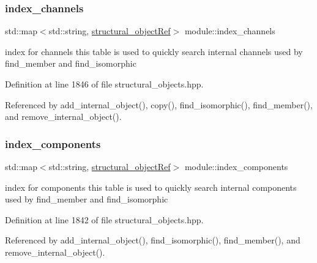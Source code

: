 \subsubsection{\texorpdfstring{index\+\_\+channels}{index\_channels}}
{\footnotesize\ttfamily std\+::map$<$std\+::string, \hyperlink{structural__objects_8hpp_a8ea5f8cc50ab8f4c31e2751074ff60b2}{structural\+\_\+object\+Ref}$>$ module\+::index\+\_\+channels\hspace{0.3cm}{\ttfamily [private]}}



index for channels this table is used to quickly search internal channels used by find\+\_\+member and find\+\_\+isomorphic 



Definition at line 1846 of file structural\+\_\+objects.\+hpp.



Referenced by add\+\_\+internal\+\_\+object(), copy(), find\+\_\+isomorphic(), find\+\_\+member(), and remove\+\_\+internal\+\_\+object().

\mbox{\label{classmodule_aaf6c17fc710da7415f1a8d566e7f9363}} 
\subsubsection{\texorpdfstring{index\+\_\+components}{index\_components}}
{\footnotesize\ttfamily std\+::map$<$std\+::string, \hyperlink{structural__objects_8hpp_a8ea5f8cc50ab8f4c31e2751074ff60b2}{structural\+\_\+object\+Ref}$>$ module\+::index\+\_\+components\hspace{0.3cm}{\ttfamily [private]}}



index for components this table is used to quickly search internal components used by find\+\_\+member and find\+\_\+isomorphic 



Definition at line 1842 of file structural\+\_\+objects.\+hpp.



Referenced by add\+\_\+internal\+\_\+object(), find\+\_\+isomorphic(), find\+\_\+member(), and remove\+\_\+internal\+\_\+object().

\mbox{\label{classmodule_a7e195316824998c2a86b508ab4161a49}} 
